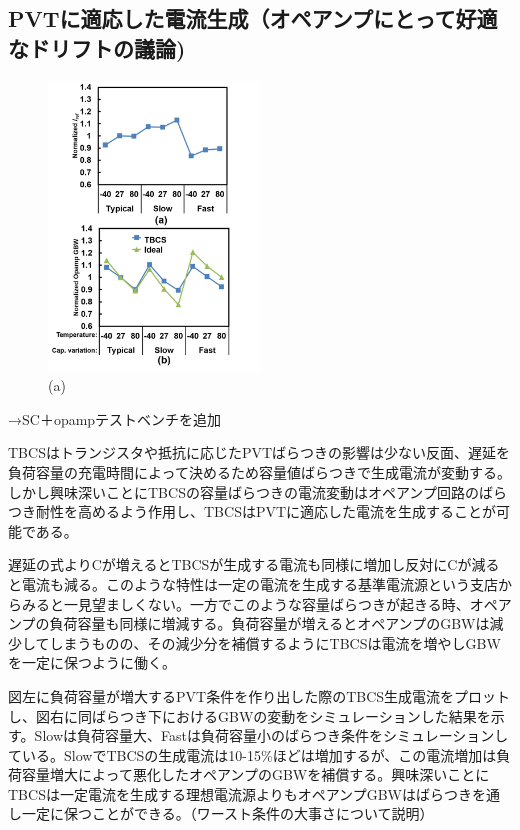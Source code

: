 \documentclass[letterpaper, 10 pt, conference]{ieeeconf}  %
\begin{document}
\subsection{PVTに適応した電流生成（オペアンプにとって好適なドリフトの議論)}
\begin{figure}[!]
\centering
 \includegraphics[width=0.5\textwidth]{figs/iref_var.png}
  \caption{(a) 
}
\label{fig2}
\end{figure}
→SC＋opampテストベンチを追加

TBCSはトランジスタや抵抗に応じたPVTばらつきの影響は少ない反面、遅延を負荷容量の充電時間によって決めるため容量値ばらつきで生成電流が変動する。しかし興味深いことにTBCSの容量ばらつきの電流変動はオペアンプ回路のばらつき耐性を高めるよう作用し、TBCSはPVTに適応した電流を生成することが可能である。

遅延の式よりCが増えるとTBCSが生成する電流も同様に増加し反対にCが減ると電流も減る。このような特性は一定の電流を生成する基準電流源という支店からみると一見望ましくない。一方でこのような容量ばらつきが起きる時、オペアンプの負荷容量も同様に増減する。負荷容量が増えるとオペアンプのGBWは減少してしまうものの、その減少分を補償するようにTBCSは電流を増やしGBWを一定に保つように働く。

図左に負荷容量が増大するPVT条件を作り出した際のTBCS生成電流をプロットし、図右に同ばらつき下におけるGBWの変動をシミュレーションした結果を示す。Slowは負荷容量大、Fastは負荷容量小のばらつき条件をシミュレーションしている。SlowでTBCSの生成電流は10-15\%ほどは増加するが、この電流増加は負荷容量増大によって悪化したオペアンプのGBWを補償する。興味深いことにTBCSは一定電流を生成する理想電流源よりもオペアンプGBWはばらつきを通し一定に保つことができる。（ワースト条件の大事さについて説明）
\end{document}
